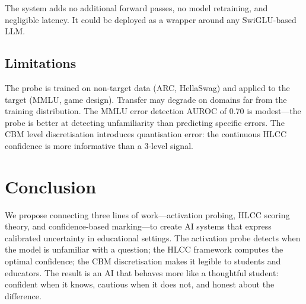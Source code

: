 \documentclass[11pt,a4paper]{article}
\begin{document}
The system adds no additional forward passes, no model retraining, and negligible latency.
It could be deployed as a wrapper around any SwiGLU-based LLM.

\subsection{Limitations}

The probe is trained on non-target data (ARC, HellaSwag) and applied to the target (MMLU, game design).
Transfer may degrade on domains far from the training distribution.
The MMLU error detection AUROC of 0.70 is modest---the probe is better at detecting unfamiliarity than predicting specific errors.
The CBM level discretisation introduces quantisation error: the continuous HLCC confidence is more informative than a 3-level signal.

\section{Conclusion}

We propose connecting three lines of work---activation probing, HLCC scoring theory, and confidence-based marking---to create AI systems that express calibrated uncertainty in educational settings.
The activation probe detects when the model is unfamiliar with a question; the HLCC framework computes the optimal confidence; the CBM discretisation makes it legible to students and educators.
The result is an AI that behaves more like a thoughtful student: confident when it knows, cautious when it does not, and honest about the difference.



\end{document}
